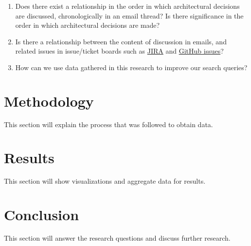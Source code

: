 \documentclass[a4paper, 12pt]{article}
\begin{document}
	\begin{enumerate}
		\item Does there exist a relationship in the order in which architectural decisions are discussed, chronologically in an email thread? Is there significance in the order in which architectural decisions are made?
		
		\item Is there a relationship between the content of discussion in emails, and related issues in issue/ticket boards such as \href{https://www.atlassian.com/software/jira}{JIRA} and \href{https://github.com/features/issues}{GitHub issues}?
		
		\item How can we use data gathered in this research to improve our search queries?
	\end{enumerate}

\section{Methodology}
	This section will explain the process that was followed to obtain data.

\section{Results}
	This section will show visualizations and aggregate data for results.

\section{Conclusion}
	This section will answer the research questions and discuss further research.
\end{document}

